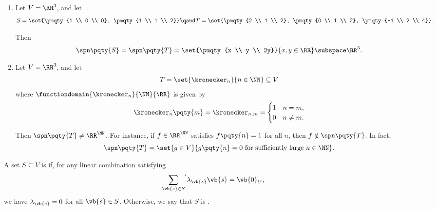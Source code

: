 \begin{examples}
    \begin{enumerate}[label=(\roman*)]
        \item Let \(V = \RR^3\), and let
        \[
            S = \set{\pmqty{1 \\ 0 \\ 0}, \pmqty{1 \\ 1 \\ 2}} \qand T = \set{\pmqty{2 \\ 1 \\ 2}, \pmqty{0 \\ 1 \\ 2}, \pmqty{-1 \\ 2 \\ 4}}.
        \]

        Then
        \[
            \spn\pqty{S} = \spn\pqty{T} = \set{\pmqty{x \\ y \\ 2y}}{x, y \in \RR} \subspace \RR^3.
        \]

        \item Let \(V = \RR^3\), and let
        \[
            T = \set{\kronecker_n}{n \in \NN} \subseteq V
        \]
        where \(\functiondomain{\kronecker_n}{\NN}{\RR}\) is given by
        \[
            \kronecker_n\pqty{m} = \kronecker_{n, m} = \begin{cases}
                1 & n = m, \\
                0 & n \neq m.
            \end{cases}
        \]

        Then \(\spn\pqty{T} \neq \RR^\NN\). For instance, if \(f \in \RR^\NN\) satisfies \(f\pqty{n} = 1\) for all \(n\), then \(f \notin \spn\pqty{T}\). In fact,
        \[
            \spn\pqty{T} = \set{g \in V}{g\pqty{n} = 0 \text{ for sufficiently large }n \in \NN}.
        \]
    \end{enumerate}
\end{examples}

\begin{definition}
    A set \(S \subseteq V\) is  if, for any linear combination satisfying
    \[
        {\sum_{\vb{s} \in S}}' \lambda_{\vb{s}} \vb{s} = \vb{0}_V,
    \]
    we have \(\lambda_{\vb{s}} = 0\) for all \(\vb{s} \in S\). Otherwise, we say that \(S\) is .
\end{definition}

